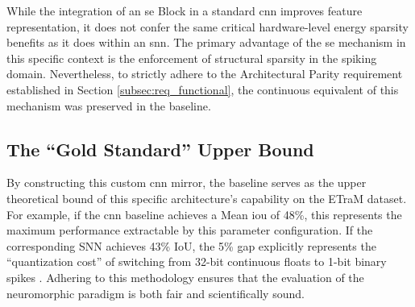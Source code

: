 While the integration of an \gls{se} Block in a standard \gls{cnn} improves feature representation, it does not confer the same critical hardware-level energy sparsity benefits as it does within an \gls{snn}. The primary advantage of the \gls{se} mechanism in this specific context is the enforcement of structural sparsity in the spiking domain. Nevertheless, to strictly adhere to the Architectural Parity requirement established in Section \ref{subsec:req_functional}, the continuous equivalent of this mechanism was preserved in the baseline.


\subsection{The ``Gold Standard'' Upper Bound}
By constructing this custom \gls{cnn} mirror, the baseline serves as the upper theoretical bound of this specific architecture's capability on the ETraM dataset. 
For example, if the \gls{cnn} baseline achieves a Mean \gls{iou} of 48\%, this represents the maximum performance extractable by this parameter configuration. 
If the corresponding SNN achieves 43\% IoU, the 5\% gap explicitly represents the ``quantization cost'' of switching from 32-bit continuous floats to 1-bit binary spikes \cite{cordone2022objectdetectionspikingneural}. 
Adhering to this methodology ensures that the evaluation of the neuromorphic paradigm is both fair and scientifically sound.


